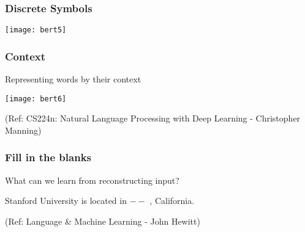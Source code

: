 \begin{frame}[fragile]\frametitle{Discrete Symbols}


\begin{center}
\texttt{[image: bert5]}
\end{center}		  



\end{frame}

\begin{frame}[fragile]\frametitle{Context}

Representing words by their context

\begin{center}
\texttt{[image: bert6]}
\end{center}		  


{\tiny (Ref: CS224n: Natural Language Processing with Deep Learning - Christopher Manning)}

\end{frame}

\begin{frame}[fragile]\frametitle{Fill in the blanks}

What can we learn from reconstructing input?

\begin{center}
Stanford University is located in $--$	, California.
\end{center}		  

{\tiny (Ref: Language \& Machine Learning - John Hewitt)}
\end{frame}





